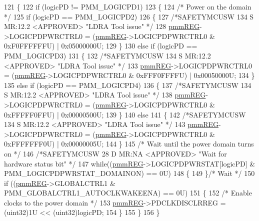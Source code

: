 \begin{DoxyCode}
121 \{
122     \textcolor{keywordflow}{if} (logicPD != PMM\_LOGICPD1)
123     \{
124         \textcolor{comment}{/* Power on the domain */}
125         \textcolor{keywordflow}{if} (logicPD == PMM\_LOGICPD2)
126         \{
127             \textcolor{comment}{/*SAFETYMCUSW 134 S MR:12.2 <APPROVED> "LDRA Tool issue" */}
128             \mbox{\hyperlink{reg__pmm_8h_a57b193bea1bf1951b97bdfee07f48598}{pmmREG}}->LOGICPDPWRCTRL0 = (\mbox{\hyperlink{reg__pmm_8h_a57b193bea1bf1951b97bdfee07f48598}{pmmREG}}->LOGICPDPWRCTRL0 & 0xF0FFFFFFU) | 0x05000000U;
129         \}
130         \textcolor{keywordflow}{else} \textcolor{keywordflow}{if} (logicPD == PMM\_LOGICPD3)
131         \{
132            \textcolor{comment}{/*SAFETYMCUSW 134 S MR:12.2 <APPROVED> "LDRA Tool issue" */}
133             \mbox{\hyperlink{reg__pmm_8h_a57b193bea1bf1951b97bdfee07f48598}{pmmREG}}->LOGICPDPWRCTRL0 = (\mbox{\hyperlink{reg__pmm_8h_a57b193bea1bf1951b97bdfee07f48598}{pmmREG}}->LOGICPDPWRCTRL0 & 0xFFF0FFFFU) | 0x00050000U;
134         \}
135         \textcolor{keywordflow}{else} \textcolor{keywordflow}{if} (logicPD == PMM\_LOGICPD4)
136         \{
137            \textcolor{comment}{/*SAFETYMCUSW 134 S MR:12.2 <APPROVED> "LDRA Tool issue" */}
138             \mbox{\hyperlink{reg__pmm_8h_a57b193bea1bf1951b97bdfee07f48598}{pmmREG}}->LOGICPDPWRCTRL0 = (\mbox{\hyperlink{reg__pmm_8h_a57b193bea1bf1951b97bdfee07f48598}{pmmREG}}->LOGICPDPWRCTRL0 & 0xFFFFF0FFU) | 0x00000500U;
139         \}
140         \textcolor{keywordflow}{else}
141         \{
142            \textcolor{comment}{/*SAFETYMCUSW 134 S MR:12.2 <APPROVED> "LDRA Tool issue" */}
143             \mbox{\hyperlink{reg__pmm_8h_a57b193bea1bf1951b97bdfee07f48598}{pmmREG}}->LOGICPDPWRCTRL0 = (\mbox{\hyperlink{reg__pmm_8h_a57b193bea1bf1951b97bdfee07f48598}{pmmREG}}->LOGICPDPWRCTRL0 & 0xFFFFFFF0U) | 0x00000005U;
144         \}
145         \textcolor{comment}{/* Wait until the power domain turns on */}
146         \textcolor{comment}{/*SAFETYMCUSW 28 D MR:NA <APPROVED> "Wait for hardware status bit" */}
147         \textcolor{keywordflow}{while}((\mbox{\hyperlink{reg__pmm_8h_a57b193bea1bf1951b97bdfee07f48598}{pmmREG}}->LOGICPDPWRSTAT[logicPD] & PMM\_LOGICPDPWRSTAT\_DOMAINON) == 0U)
148         \{ 
149         \}\textcolor{comment}{/* Wait */}  
150         \textcolor{keywordflow}{if} ((\mbox{\hyperlink{reg__pmm_8h_a57b193bea1bf1951b97bdfee07f48598}{pmmREG}}->GLOBALCTRL1 & PMM\_GLOBALCTRL1\_AUTOCLKWAKEENA) == 0U)
151         \{
152             \textcolor{comment}{/* Enable clocks to the power domain */}
153             \mbox{\hyperlink{reg__pmm_8h_a57b193bea1bf1951b97bdfee07f48598}{pmmREG}}->PDCLKDISCLRREG = (uint32)1U << (uint32)logicPD;
154         \}
155     \}
156 \}
\end{DoxyCode}
\mbox{\label{group__PMM_ga3395d248f6418becca238c5db150fc73}} 
